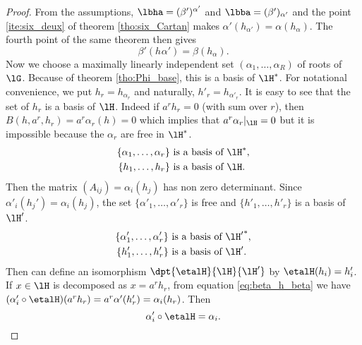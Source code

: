 \begin{proof}
From the assumptions, $\lbha=(\beta')^{\alpha'}$ and $\lbba=(\beta')_{\alpha'}$ and the point \ref{ite:six_deux} of theorem \ref{tho:six_Cartan} makes $\alpha'(h_{\alpha'})=\alpha(h_{\alpha})$. The fourth point of the same theorem then gives 
\begin{equation}\label{eq:beta_h_beta}
\beta'(h_{}\alpha')=\beta(h_{\alpha}).
\end{equation}
Now we choose a maximally linearly independent set $(\alpha_1,\ldots,\alpha_R)$ of roots of $\lG$. Because of theorem \ref{tho:Phi_base}, this is a basis of $\lH^*$. For notational convenience, we put $h_r=h_{\alpha_r}$ and naturally, $h'_r=h_{\alpha'_r}$. It is easy to see that the set of $h_r$ is a basis of $\lH$. Indeed if $a^rh_r=0$ (with sum over $r$), then $B(h,a^r,h_r)=a^r\alpha_r(h)=0$ which implies that $a^r\alpha_r|_{\lH}=0$ but it is impossible because the $\alpha_r$ are free in $\lH^*$.
\begin{equation*}
\begin{split}
\{ \alpha_1,\ldots,\alpha_r \}&\textrm{ is a basis of $\lH^*$},\\
\{ h_1,\ldots,h_r \}&\textrm{ is a basis of $\lH$}.
\end{split}  
\end{equation*}
Then the matrix $(A_{ij})=\alpha_i(h_j)$ has non zero determinant. Since $\alpha'_i(h_j')=\alpha_i(h_j)$, the set $\{\alpha'_1,\ldots,\alpha'_r\}$ is free and $\{h'_1,\ldots,h'_r\}$ is a basis of $\lH'$.
\begin{equation*}
\begin{split}
\{ \alpha'_1,\ldots,\alpha'_r \}&\textrm{ is a basis of ${\lH'}^*$},\\
\{ h'_1,\ldots,h'_r \}&\textrm{ is a basis of $\lH'$}.
\end{split}  
\end{equation*}
Then can define an isomorphism $\dpt{\etalH}{\lH}{\lH'}$ by $\etalH(h_i)=h'_i$. If $x\in\lH$ is decomposed as $x=a^rh_r$, from equation \eqref{eq:beta_h_beta} we have $(\alpha'_i\circ\etalH)(a^rh_r)=a^r\alpha'(h'_r)=\alpha_i(h_r)$. Then
\[
\alpha'_i\circ\etalH=\alpha_i.
\]


\end{proof}
